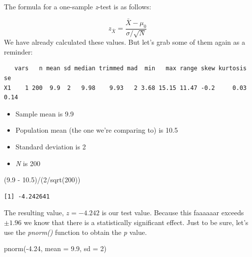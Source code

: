 \documentclass[
  11pt,
]{book}
\newenvironment{Shaded}{\begin{snugshade}}{\end{snugshade}}
\newcommand{\AttributeTok}[1]{\textcolor[rgb]{0.77,0.63,0.00}{#1}}
\newcommand{\DecValTok}[1]{\textcolor[rgb]{0.00,0.00,0.81}{#1}}
\newcommand{\FloatTok}[1]{\textcolor[rgb]{0.00,0.00,0.81}{#1}}
\newcommand{\FunctionTok}[1]{\textcolor[rgb]{0.00,0.00,0.00}{#1}}
\newcommand{\NormalTok}[1]{#1}
\newcommand{\SpecialCharTok}[1]{\textcolor[rgb]{0.00,0.00,0.00}{#1}}
\providecommand{\tightlist}{%
  \setlength{\itemsep}{0pt}\setlength{\parskip}{0pt}}
\begin{document}
The formula for a one-sample \emph{z}-test is as follows:

\[
z_{\bar{X}} =  \frac{\bar{X} - \mu_0}{\sigma / \sqrt{N}}
\]
We have already calculated these values. But let's grab some of them again as a reminder:

\begin{Shaded}
\end{Shaded}

\begin{verbatim}
   vars   n mean sd median trimmed mad  min   max range skew kurtosis   se
X1    1 200  9.9  2   9.98    9.93   2 3.68 15.15 11.47 -0.2     0.03 0.14
\end{verbatim}

\begin{itemize}
\tightlist
\item
  Sample mean is 9.9
\item
  Population mean (the one we're comparing to) is 10.5
\item
  Standard deviation is 2
\item
  \emph{N} is 200
\end{itemize}

\begin{Shaded}
\begin{Highlighting}[]
\NormalTok{(}\FloatTok{9.9} \SpecialCharTok{{-}} \FloatTok{10.5}\NormalTok{)}\SpecialCharTok{/}\NormalTok{(}\DecValTok{2}\SpecialCharTok{/}\FunctionTok{sqrt}\NormalTok{(}\DecValTok{200}\NormalTok{))}
\end{Highlighting}
\end{Shaded}

\begin{verbatim}
[1] -4.242641
\end{verbatim}

The resulting value, \(z = -4.242\) is our test value. Because this faaaaaar exceeds \(\pm 1.96\) we know that there is a statistically significant effect. Just to be sure, let's use the \emph{pnorm()} function to obtain the \emph{p} value.

\begin{Shaded}
\begin{Highlighting}[]
\FunctionTok{pnorm}\NormalTok{(}\SpecialCharTok{{-}}\FloatTok{4.24}\NormalTok{, }\AttributeTok{mean =} \FloatTok{9.9}\NormalTok{, }\AttributeTok{sd =} \DecValTok{2}\NormalTok{)}
\end{Highlighting}
\end{Shaded}
\end{document}
